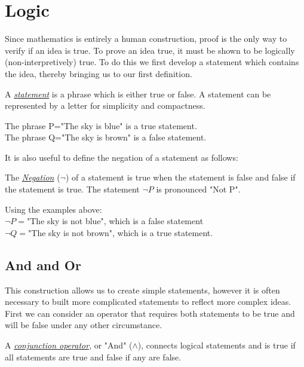 \section{Logic}
Since mathematics is entirely a human construction, proof is the only way to verify if an idea is true.
To prove an idea true, it must be shown to be logically (non-interpretively) true. To do this we first develop a statement which contains the idea, thereby bringing us to our first definition.

\begin{defn}
	A \underline{\emph{statement}} is a phrase which is either true or false. A statement can be represented by a letter for simplicity and compactness.
\end{defn}

\begin{ex}
	The phrase P="The sky is blue" is a true statement.\\
	The phrase Q="The sky is brown" is a false statement.
\end{ex}

It is also useful to define the negation of a statement as follows:
\begin{defn}
	The \underline{\emph{Negation}} ($\neg$) of a statement is true when the statement is false and false if the statement is true.
	The statement $\neg P$ is pronounced "Not P".
\end{defn}

\begin{ex} Using the examples above:\\
	$\neg P=$"The sky is not blue", which is a false statement\\
	$\neg Q=$"The sky is not brown", which is a true statement.
\end{ex}

\subsection{And and Or}
This construction allows us to create simple statements, however it is often necessary to built more complicated statements to reflect more complex ideas.
First we can consider an operator that requires both statements to be true and will be false under any other circumstance.

\begin{defn}
	A \underline{\emph{conjunction operator}}, or "And" ($\land$), connects logical statements and is true if all statements are true and false if any are false.
\end{defn}

